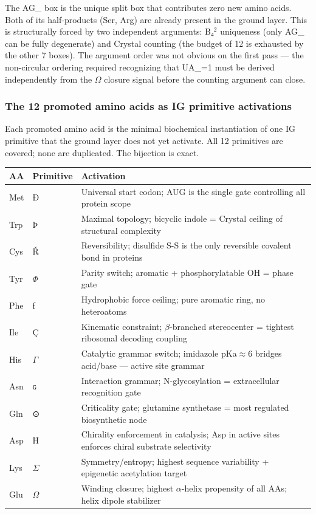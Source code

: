 \documentclass[12pt,a4paper]{article}
\begin{document}
The AG\_ box is the unique split box that contributes zero new amino acids. Both of its half-products (Ser, Arg) are already present in the ground layer. This is structurally forced by two independent arguments: B₄$^{2}$ uniqueness (only AG\_ can be fully degenerate) and Crystal counting (the budget of 12 is exhausted by the other 7 boxes). The argument order was not obvious on the first pass --- the non-circular ordering required recognizing that UA\_=1 must be derived independently from the $\Omega$ closure signal before the counting argument can close.

\subsubsection{The 12 promoted amino acids as IG primitive activations}

Each promoted amino acid is the minimal biochemical instantiation of one IG primitive that the ground layer does not yet activate. All 12 primitives are covered; none are duplicated. The bijection is exact.

\begin{table}[htbp]
\centering
\small
{}
\begin{tabularx}{\textwidth}{>{\centering\arraybackslash}X >{\centering\arraybackslash}X >{\centering\arraybackslash}X}
\toprule
\rowcolor{gray!25}\textbf{AA} & \textbf{Primitive} & \textbf{Activation} \\
\midrule
\rowcolors{1}{white}{gray!10}
Met & Ð & Universal start codon; AUG is the single gate controlling all protein scope \\
Trp & Þ & Maximal topology; bicyclic indole = Crystal ceiling of structural complexity \\
Cys & Ř & Reversibility; disulfide S-S is the only reversible covalent bond in proteins \\
Tyr & $\Phi$ & Parity switch; aromatic + phosphorylatable OH = phase gate \\
Phe & ƒ & Hydrophobic force ceiling; pure aromatic ring, no heteroatoms \\
Ile & Ç & Kinematic constraint; $\beta$-branched stereocenter = tightest ribosomal decoding coupling \\
His & $\Gamma$ & Catalytic grammar switch; imidazole pKa$\approx$6 bridges acid/base --- active site grammar \\
Asn & ɢ & Interaction grammar; N-glycosylation = extracellular recognition gate \\
Gln & ⊙ & Criticality gate; glutamine synthetase = most regulated biosynthetic node \\
Asp & Ħ & Chirality enforcement in catalysis; Asp in active sites enforces chiral substrate selectivity \\
Lys & $\Sigma$ & Symmetry/entropy; highest sequence variability + epigenetic acetylation target \\
Glu & $\Omega$ & Winding closure; highest $\alpha$-helix propensity of all AAs; helix dipole stabilizer \\
\bottomrule
\end{tabularx}
\end{table}
\end{document}

